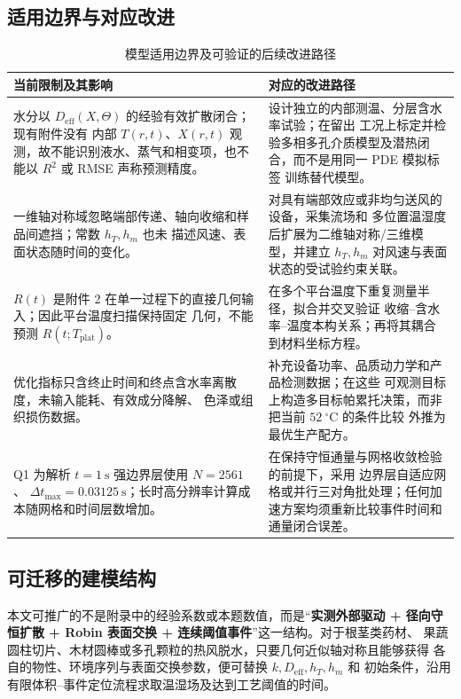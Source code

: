 \documentclass[withoutpreface,bwprint]{cumcmthesis}
\begin{document}
\subsection{适用边界与对应改进}

\begin{table}[H]
  \centering
  \setcounter{table}{10}
  \caption{模型适用边界及可验证的后续改进路径}
  \label{tab:limits}
  \begin{tabularx}{\textwidth}{p{}X}
  \toprule
  当前限制及其影响 & 对应的改进路径 \\
  \midrule
  水分以 $D_{\mathrm{eff}}(X,\Theta)$ 的经验有效扩散闭合；现有附件没有
  内部 $T(r,t)$、$X(r,t)$ 观测，故不能识别液水、蒸气和相变项，也不能以
  $R^2$ 或 RMSE 声称预测精度。 & 设计独立的内部测温、分层含水率试验；在留出
  工况上标定并检验多相多孔介质模型及潜热闭合，而不是用同一 PDE 模拟标签
  训练替代模型。 \\
  一维轴对称域忽略端部传递、轴向收缩和样品间遮挡；常数 $h_T,h_m$ 也未
  描述风速、表面状态随时间的变化。 & 对具有端部效应或非均匀送风的设备，采集流场和
  多位置温湿度后扩展为二维轴对称/三维模型，并建立 $h_T,h_m$ 对风速与表面
  状态的受试验约束关联。 \\
  $R(t)$ 是附件 2 在单一过程下的直接几何输入；因此平台温度扫描保持固定
  几何，不能预测 $R(t;T_{\mathrm{plat}})$。 & 在多个平台温度下重复测量半径，拟合并交叉验证
  收缩--含水率--温度本构关系；再将其耦合到材料坐标方程。 \\
  优化指标只含终止时间和终点含水率离散度，未输入能耗、有效成分降解、
  色泽或组织损伤数据。 & 补充设备功率、品质动力学和产品检测数据；在这些
  可观测目标上构造多目标帕累托决策，而非把当前 $52\ ^\circ\mathrm{C}$ 的条件比较
  外推为最优生产配方。 \\
  Q1 为解析 $t=1\ \mathrm{s}$ 强边界层使用 $N=2561$、
  $\Delta t_{\max}=0.03125\ \mathrm{s}$；长时高分辨率计算成本随网格和时间层数增加。 & 在保持守恒通量与网格收敛检验的前提下，采用
  边界层自适应网格或并行三对角批处理；任何加速方案均须重新比较事件时间和
  通量闭合误差。 \\
  \bottomrule
  \end{tabularx}
\end{table}

\subsection{可迁移的建模结构}

本文可推广的不是附录中的经验系数或本题数值，而是“\textbf{实测外部驱动 +
径向守恒扩散 + Robin 表面交换 + 连续阈值事件}”这一结构。对于根茎类药材、
果蔬圆柱切片、木材圆棒或多孔颗粒的热风脱水，只要几何近似轴对称且能够获得
各自的物性、环境序列与表面交换参数，便可替换 $k,D_{\mathrm{eff}},h_T,h_m$ 和
初始条件，沿用有限体积--事件定位流程求取温湿场及达到工艺阈值的时间。
\end{document}
